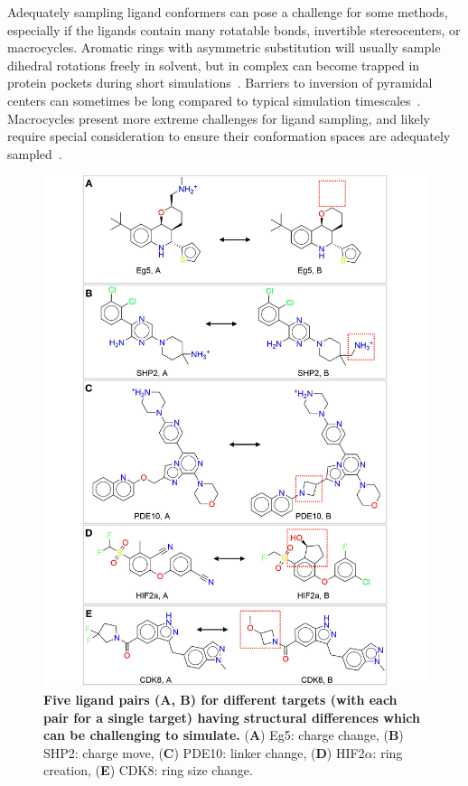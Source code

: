 \documentclass[9pt,bestpractices]{livecoms}
\begin{document}
Adequately sampling ligand conformers can pose a challenge for some methods, especially if the ligands contain many rotatable bonds, invertible stereocenters, or macrocycles.
Aromatic rings with asymmetric substitution will usually sample dihedral rotations freely in solvent, but in complex can become trapped in protein pockets during short simulations~\cite{kaus_how_2015,sasmal_sampling_2020}. 
Barriers to inversion of pyramidal centers can sometimes be long compared to typical simulation timescales~\cite{koeppl1967inversion}.
Macrocycles present more extreme challenges for ligand sampling, and likely require special consideration to ensure their conformation spaces are adequately sampled~\cite{wagner_computational_2017,yu_accurate_2017,paulsen_evaluation_2020}. 

\begin{figure}[!ht]
    \centering
    \includegraphics[width=.48\textwidth]{figures/dataset/difficult_perturbations_enhanced.pdf}
    \caption{\textbf{Five ligand pairs (A, B) for different targets (with each pair for a single target)
    having structural differences which can be challenging to simulate.}
    (\textbf{A}) Eg5: charge change,
    (\textbf{B}) SHP2: charge move,
    (\textbf{C}) PDE10: linker change,
    (\textbf{D}) HIF2$\alpha$: ring creation,
    (\textbf{E}) CDK8: ring size change. 
    }
    \label{fig:difficult_perturbations}
\end{figure}
\end{document}

